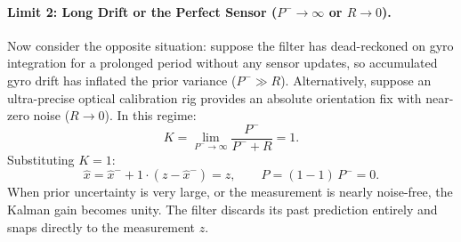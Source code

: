 \paragraph{Limit 2: Long Drift or the Perfect Sensor ($P^- \to \infty$ or $R \to 0$).}
Now consider the opposite situation: suppose the filter has dead-reckoned on gyro integration for a prolonged period without any sensor updates, so accumulated gyro drift has inflated the prior variance ($P^- \gg R$). Alternatively, suppose an ultra-precise optical calibration rig provides an absolute orientation fix with near-zero noise ($R \to 0$). In this regime:
\begin{equation}
  K = \lim_{P^- \to \infty} \frac{P^-}{P^- + R} = 1 .
\end{equation}
Substituting $K = 1$:
\begin{equation}
  \hat{x} = \hat{x}^- + 1 \cdot (z - \hat{x}^-) = z , \qquad P = (1 - 1)\, P^- = 0 .
\end{equation}
When prior uncertainty is very large, or the measurement is nearly noise-free, the Kalman gain becomes unity. The filter discards its past prediction entirely and snaps directly to the measurement $z$.

